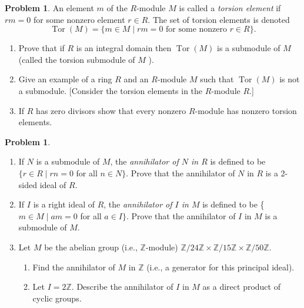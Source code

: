 \documentclass{amsart}
\numberwithin{equation}{section}
\theoremstyle{definition}
\newtheorem{problem}[thm]{Problem}
\begin{document}
\begin{problem}
  An element \(m\) of the \(R\)-module \(M\) is called a \emph{torsion
  element} if \(r m=0\) for some nonzero element \(r \in R\). The set
  of torsion elements is denoted
\[
\operatorname{Tor}(M)=\{m \in M \mid r m=0 \text { for some nonzero } r \in R\} .
\]
\begin{enumerate}
\item Prove that if \(R\) is an integral domain then \(\operatorname{Tor}(M)\) is a submodule of \(M\) (called the torsion submodule of \(M\) ).
\item  Give an example of a ring \(R\) and an \(R\)-module \(M\) such that \(\operatorname{Tor}(M)\) is not a submodule. [Consider the torsion elements in the \(R\)-module \(R\).]
\item If \(R\) has zero divisors show that every nonzero \(R\)-module has nonzero torsion elements.
\end{enumerate}
\end{problem}

\begin{problem}
  \begin{enumerate}
  \item If \(N\) is a submodule of \(M\), the \emph{annihilator of \(N\) in \(R\) } is defined to be \(\{r \in R \mid r n=0\) for all
    \(n \in N\}\). Prove that the annihilator of \(N\) in \(R\) is a
    2-sided ideal of \(R\).
  \item If \(I\) is a right ideal of \(R\), the \emph{annihilator of \(I\) in \(M\)} is defined to be \{ \(m \in M \mid a m=0\) for all \(a \in I\}\). Prove that the annihilator of \(I\) in \(M\) is a submodule of \(M\).
  \item Let \(M\) be the abelian group (i.e., \(\mathbb{Z}\)-module) \(\mathbb{Z} / 24 \mathbb{Z} \times \mathbb{Z} / 15 \mathbb{Z} \times \mathbb{Z} / 50 \mathbb{Z}\).
    \begin{enumerate}
    \item Find the annihilator of \(M\) in \(\mathbb{Z}\) (i.e., a generator for this principal ideal).
    \item Let \(I=2 \mathbb{Z}\). Describe the annihilator of \(I\) in \(M\) as a direct product of cyclic groups.
    \end{enumerate}
  \end{enumerate}
\end{problem}
\end{document}
